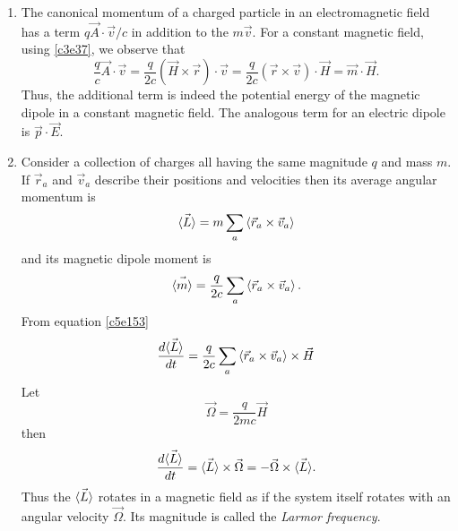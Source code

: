 \begin{enumerate}
\item The canonical momentum of a charged particle in an electromagnetic field 
has a term $q\vec{A}\cdot\vec{v}/c$ in addition to the $m\vec{v}$. For a 
constant magnetic field, using \eqref{c3e37}, we observe that
\begin{equation}\label{c5e154}
\frac{q}{c}\vec{A}\cdot\vec{v} = 
\frac{q}{2c}(\vec{H} \times \vec{r})\cdot\vec{v} = 
\frac{q}{2c}(\vec{r}\times\vec{v})\cdot\vec{H} = \vec{m}\cdot\vec{H}.
\end{equation}
Thus, the additional term is indeed the potential energy of the magnetic dipole
in a constant magnetic field. The analogous term for an electric dipole is 
$\vec{p}\cdot\vec{E}$.

\item Consider a collection of charges all having the same magnitude $q$ and 
mass $m$. If $\vec{r}_a$ and $\vec{v}_a$ describe their positions and 
velocities then its average angular momentum is
\[
\vec{\left\langle{L}\right\rangle} = m\sum_a\left\langle{\vec{r}_a \times \vec{v}_a}\right\rangle
\]
and its magnetic dipole moment is
\[
\vec{\left\langle{m}\right\rangle} = \frac{q}{2c}\sum_a\left\langle{\vec{r}_a \times \vec{v}_a}\right\rangle.
\]
From equation \eqref{c5e153}
\[
\frac{d{\vec{\left\langle{L}\right\rangle}}}{d{t}} = \frac{q}{2c}\sum_a\left\langle{\vec{r}_a \times \vec{v}_a}\right\rangle \times 
\vec{H}
\]
Let
\begin{equation}\label{c5e155}
\vec{\Omega} = \frac{q}{2mc}\vec{H}
\end{equation}
then 
\begin{equation}\label{c5e156}
\frac{d{\vec{\left\langle{L}\right\rangle}}}{d{t}} = \vec{\left\langle{L}\right\rangle} \times \vec{\Omega} = -\vec{\Omega} \times \vec{\left\langle{L}\right\rangle}.
\end{equation}
Thus the $\vec{\left\langle{L}\right\rangle}$ rotates in a magnetic field as if the system itself rotates
with an angular velocity $\vec{\Omega}$. Its magnitude is called the 
\emph{Larmor frequency}.
\end{enumerate}


